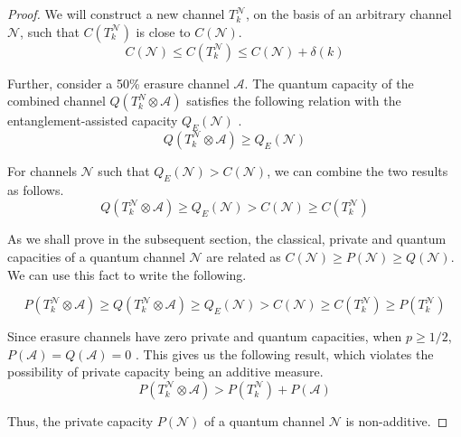 \begin{proof}
We will construct a new channel $T_k^\mathcal{N}$, on the basis of an arbitrary channel $\mathcal{N}$, such that $C(T_k^\mathcal{N})$ is close to $C(\mathcal{N})$.
$$C(\mathcal{N}) \leq C(T_k^\mathcal{N}) \leq C(\mathcal{N}) + \delta(k)$$

Further, consider a 50\% erasure channel $\mathcal{A}$. The quantum capacity of the combined channel $Q(T_k^N \otimes \mathcal{A})$ satisfies the following relation with the entanglement-assisted capacity $Q_E(\mathcal{N})$ \cite{PhysRevLett.83.3081}.
$$Q(T_k^\mathcal{N} \otimes \mathcal{A}) \geq Q_E(\mathcal{N})$$

For channels $\mathcal{N}$ such that $Q_E(\mathcal{N}) > C(\mathcal{N})$, we can combine the two results as follows.
$$Q(T_k^\mathcal{N} \otimes \mathcal{A}) \geq Q_E(\mathcal{N}) > C(\mathcal{N}) \geq C(T_k^\mathcal{N})$$

As we shall prove in the subsequent section, the classical, private and quantum capacities of a quantum channel $\mathcal{N}$ are related as $C(\mathcal{N}) \geq P(\mathcal{N}) \geq Q(\mathcal{N})$. We can use this fact to write the following.

$$P(T_k^\mathcal{N} \otimes \mathcal{A}) \geq Q(T_k^\mathcal{N} \otimes \mathcal{A}) \geq Q_E(\mathcal{N}) > C(\mathcal{N}) \geq C(T_k^\mathcal{N}) \geq P(T_k^\mathcal{N})$$

Since erasure channels have zero private and quantum capacities, when $p \geq 1/2$, $P(\mathcal{A}) = Q(\mathcal{A}) = 0$ \cite{PhysRevLett.78.3217}. This gives us the following result, which violates the possibility of private capacity being an additive measure.
$$P(T_k^\mathcal{N} \otimes \mathcal{A}) > P(T_k^\mathcal{N}) + P(\mathcal{A})$$

Thus, the private capacity $P(\mathcal{N})$ of a quantum channel $\mathcal{N}$ is non-additive.
\end{proof}

